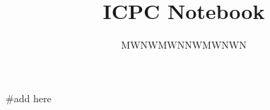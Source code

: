 \documentclass{article}
\title{ICPC Notebook}
\author{MWNWMWNNWMWNWN}
\date{}
\begin{document}
\maketitle
\tableofcontents

#add here
\end{document}
